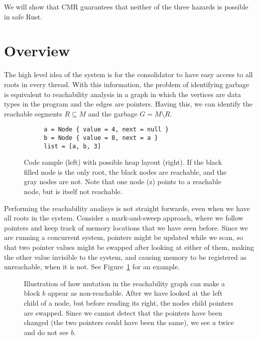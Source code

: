 We will show that CMR guarantees that neither of the three hazards is possible in safe Rust.

\section{Overview\label{sec:cmr-overview}}

The high level idea of the system is for the consolidator to have easy access to all roots in every
thread. With this information, the problem of identifying garbage is equivalent to reachability
analysis in a graph in which the vertices are data types in the program and the edges are pointers.
 Having this, we can
identify the reachable segments $R \subseteq M$ and the garbage $G = M \setminus R$.

\begin{figure}[ht]
  \centering
  \begin{subfigure}{0.45\textwidth}
    \begin{lstlisting}
a = Node { value = 4, next = null }
b = Node { value = 8, next = a }
list = [a, b, 3]
    \end{lstlisting}
  \end{subfigure}
  \hfill
  \begin{subfigure}{0.45\textwidth}
    
  \end{subfigure}
  \caption{Code sample (left) with possible heap layout (right). If the black filled node is the
  only root, the black nodes are reachable, and the gray nodes are not. Note that one node (z)
  points to a reachable node, but is itself not reachable.}
\end{figure}

Performing the reachability analisys is not straight forwards, even when we have all roots in the
system. Consider a mark-and-sweep approach, where we follow pointers and keep track of memory
locations that we have seen before. Since we are running a concurrent system, pointers might be
updated while we scan, so that two pointer values might be swapped after looking at either of them,
making the other value invisible to the system, and causing memory to be registered as unreachable,
when it is not. See Figure~\ref{fig:pointer-swap} for an example.

\begin{figure}[ht]
  \centering
  
  \caption{Illustration of how mutation in the reachability graph can make a block $b$ appear as
  non-reachable. After we have looked at the left child of a node, but before reading its right,
  the nodes child pointers are swapped. Since we cannot detect that the pointers have been changed
  (the two pointers could have been the same), we see $a$ twice and do not see $b$.%
  \label{fig:pointer-swap}}
\end{figure}

